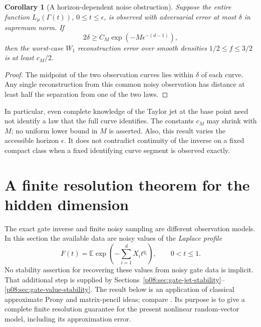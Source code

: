\documentclass[11pt,letterpaper]{article}
\newtheorem{corollary}[theorem]{Corollary}
\theoremstyle{definition}
\theoremstyle{remark}
\newcommand{\1}{\mathbf 1}
\begin{document}
\begin{corollary}[A horizon-dependent noise obstruction]
\label{p08:cor:flat-horizon}
Suppose the entire function $L_\mu(\Gamma(t))$, $0\leq t\leq\epsilon$,
is observed with adversarial error at most $\delta$ in supremum norm.
If
\begin{equation}\label{p08:eq:flat-noise-threshold}
 2\delta\geq C_M\exp(-M\epsilon^{-(d-1)}),
\end{equation}
then the worst-case $W_1$ reconstruction error over smooth densities
$1/2\leq f\leq3/2$ is at least $c_M/2$.
\end{corollary}

\begin{proof}
The midpoint of the two observation curves lies within $\delta$ of each
curve.  Any single reconstruction from this common noisy observation has
distance at least half the separation from one of the two laws.
\end{proof}

In particular, even complete knowledge of the Taylor jet at the base point
need not identify a law that the full curve identifies.  The constants
$c_M$ may shrink with $M$; no uniform lower bound in $M$ is asserted.
Also, this result varies the accessible horizon $\epsilon$.  It does not
contradict continuity of the inverse on a fixed compact class when a fixed
identifying curve segment is observed exactly.

\section{A finite resolution theorem for the hidden dimension}
\label{p08:sec:finite-blind}

The exact gate inverse and finite noisy sampling are different observation
models.  In this section the available data are noisy values of the
\emph{Laplace profile}
\[
 F(t)=\mathbb E\exp\left(-\sum_{i=1}^d X_i t^{q_i}\right),
 \qquad 0<t\leq1.
\]
No stability assertion for recovering these values from noisy gate data
is implicit.  That additional step is supplied by
Sections~\ref{p08:sec:gate-jet-stability}--\ref{p08:sec:gate-value-stability}.  The result below is an application of classical approximate Prony
and matrix-pencil ideas; compare \cite{PottsTasche2010,PottsTasche2013}.
Its purpose is to give a complete finite resolution guarantee for the
present nonlinear random-vector model, including its approximation error.
\end{document}
